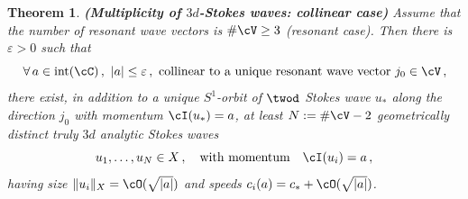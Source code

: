 \documentclass[11pt,a4paper,reqno]{article}
\numberwithin{equation}{section}
\newtheorem{theorem}{Theorem}[section]
\theoremstyle{definition}
\begin{document}
\begin{theorem}
{\bf (Multiplicity of $3d$-Stokes waves: collinear case)}
\label{Existence of 3d solutions collinear nonresonant}
Assume that the number  of resonant wave vectors is $ \# \cV \geq 3 $ (resonant case). 
       Then there is $\varepsilon >0$  such that 
    \begin{equation}\label{assumthm}
        \forall \,  
       a\in \text{int}(\cC) \, , \ 
       |a| \leq \varepsilon \, ,  \    \text{collinear 
       to a unique resonant wave vector} \ j_0 \in \cV \, , 
\end{equation}
       there exist,
       in addition to a unique 
      $S^1$-orbit of 
      $\twod $  Stokes wave $ u_*  $  
      along the direction $ j_0 $ with momentum $ \cI(u_*) = a $,  
      at least
          $ N := \#\cV-{2} $ 
         geometrically distinct 
         truly $3d$ analytic Stokes waves 
         $$ 
         u_1, \ldots, 
         u_{N} \in X \, , 
         \quad  \text{with 
         momentum} \quad 
          \cI (u_i) = a \, , 
         $$ 
         having  size $ \| u_i \|_X = \cO (\sqrt{|a|}) $
         and 
         speeds   
        $ c_i (a)  = c_* + \cO (\sqrt{  |a|}) $.
    \end{theorem}
\end{document}
